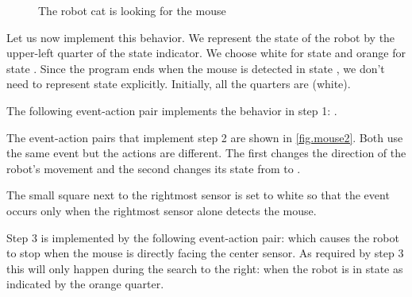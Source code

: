 \begin{figure}
	\hfill
	\caption{The robot cat is looking for the mouse}
\end{figure}

Let us now implement this behavior. We represent the state of the robot
by the upper-left quarter of the state indicator.
We choose white for state
 and orange for state .
Since the program ends when the mouse is detected in state
, we don't need to represent state 
explicitly. Initially, all the quarters are  (white).

The following event-action pair implements the behavior in step 1:
.

The event-action pairs that implement step 2 are shown in \cref{fig.mouse2}.
Both use the same event but the actions are different. The first changes
the direction of the robot's movement and the second changes its state
from  to .

The small square next to the rightmost sensor is set to white so that the event
occurs only when the rightmost sensor alone detects the mouse.

Step 3 is implemented by the following event-action pair:
which causes the robot to stop when the mouse is directly facing the center sensor.
As required by step 3 this will only happen during the search to the right: when the robot is in state  as indicated by the orange quarter.


\vfill


